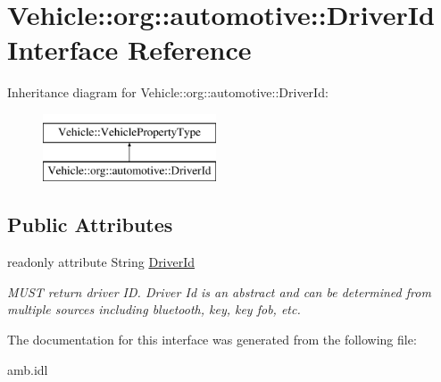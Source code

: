 \hypertarget{interfaceVehicle_1_1org_1_1automotive_1_1DriverId}{\section{Vehicle\-:\-:org\-:\-:automotive\-:\-:Driver\-Id Interface Reference}
\label{interfaceVehicle_1_1org_1_1automotive_1_1DriverId}
}
Inheritance diagram for Vehicle\-:\-:org\-:\-:automotive\-:\-:Driver\-Id\-:\begin{figure}[H]
\begin{center}
\leavevmode
\includegraphics[height=2.000000cm]{interfaceVehicle_1_1org_1_1automotive_1_1DriverId}
\end{center}
\end{figure}
\subsection*{Public Attributes}
\begin{DoxyCompactItemize}
\item 
\hypertarget{interfaceVehicle_1_1org_1_1automotive_1_1DriverId_a1156d3fdedde97e1d24f983372d08ad2}{readonly attribute String \hyperlink{interfaceVehicle_1_1org_1_1automotive_1_1DriverId_a1156d3fdedde97e1d24f983372d08ad2}{Driver\-Id}}\label{interfaceVehicle_1_1org_1_1automotive_1_1DriverId_a1156d3fdedde97e1d24f983372d08ad2}

\begin{DoxyCompactList}\small\item\em M\-U\-S\-T return driver I\-D. Driver Id is an abstract and can be determined from multiple sources including bluetooth, key, key fob, etc. \end{DoxyCompactList}\end{DoxyCompactItemize}


The documentation for this interface was generated from the following file\-:\begin{DoxyCompactItemize}
\item 
amb.\-idl\end{DoxyCompactItemize}
